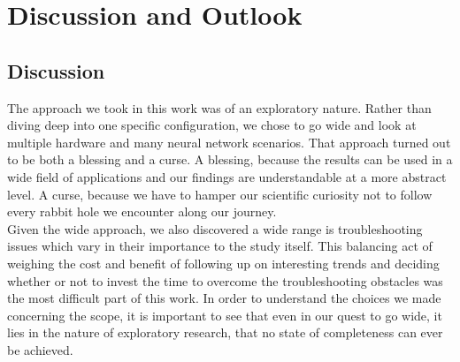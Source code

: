 \chapter{Discussion and Outlook}\label{chap:discussion}

\section{Discussion}

The approach we took in this work was of an exploratory nature. Rather than diving deep into one specific configuration, we chose to go wide and look at multiple hardware and many neural network scenarios. That approach turned out to be both a blessing and a curse. A blessing, because the results can be used in a wide field of applications and our findings are understandable at a more abstract level. A curse, because we have to hamper our scientific curiosity not to follow every rabbit hole we encounter along our journey. \\
Given the wide approach, we also discovered a wide range is troubleshooting issues which vary in their importance to the study itself. This balancing act of weighing the cost and benefit of following up on interesting trends and deciding whether or not to invest the time to overcome the troubleshooting obstacles was the most difficult part of this work. In order to understand the choices we made concerning the scope, it is important to see that even in our quest to go wide, it lies in the nature of exploratory research, that no state of completeness can ever be achieved.

